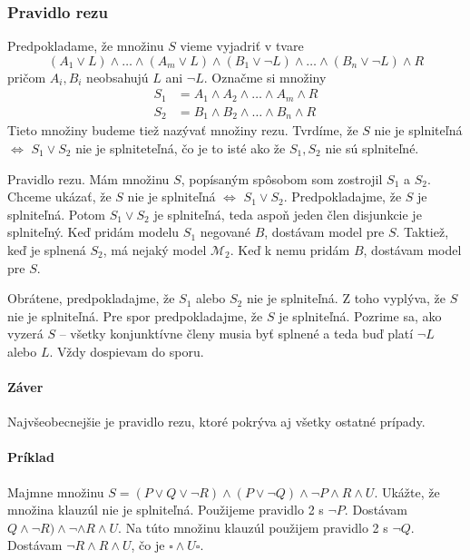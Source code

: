 \subsubsection{Pravidlo rezu}
Predpokladame, že množinu $S$ vieme vyjadriť v tvare
\begin{equation*}
    (A_1 \lor L) \land \ldots \land (A_m \lor L) \land 
    (B_1 \lor \neg L) \land \ldots \land (B_n \lor \neg L) \land R
\end{equation*}
pričom $A_i, B_i$ neobsahujú $L$ ani $\neg L$.
Označme si množiny
\begin{align*}
    S_1 &= A_1 \land A_2 \land \ldots \land A_m \land R \\
    S_2 &= B_1 \land B_2 \land \ldots \land B_n \land R
\end{align*}
Tieto množiny budeme tiež nazývať množiny rezu.
Tvrdíme, že $S$ nie je splniteľná $\iff$ $S_1 \lor S_2$ nie je
splniteteľná, čo je to isté ako že $S_1,S_2$ nie sú splniteľné.

\startFIXME

\begin{dokaz}
    Pravidlo rezu. Mám množinu $S$, popísaným spôsobom som zostrojil
    $S_1$ a $S_2$. Chceme ukázať, že $S$ nie je splniteľná $\iff$ $S_1 \lor
    S_2$. Predpokladajme, že $S$ je splniteľná. Potom $S_1 \lor S_2$ je
    splniteľná, teda aspoň jeden člen disjunkcie je splniteľný. Keď pridám
    modelu $S_1$ negované $B$, dostávam model pre $S$. Taktiež, keď je
    splnená $S_2$, má nejaký model $\mathcal{M_2}$. Keď k nemu pridám $B$,
    dostávam model pre $S$.

    \par Obrátene, predpokladajme, že $S_1$ alebo $S_2$ nie je splniteľná. Z
    toho vyplýva, že $S$ nie je splniteľná. Pre spor predpokladajme, že $S$
    je splniteľná. Pozrime sa, ako vyzerá $S$ -- všetky konjunktívne členy
    musia byť splnené a teda buď platí $\neg L$ alebo $L$. Vždy dospievam do
    sporu.
\end{dokaz}

\paragraph{Záver} Najvšeobecnejšie je pravidlo rezu, ktoré pokrýva aj všetky
ostatné prípady.

\paragraph{Príklad} Majmne množinu $S=(P \lor Q \lor \neg R) \land (P \lor \neg
Q) \land \neg P \land R \land U$. Ukážte, že množina klauzúl nie je splniteľná.
Použijeme pravidlo 2 s $\neg P$. Dostávam $Q\land\neg R) \land \neg  \land R
\land U$. Na túto množinu klauzúl použijem pravidlo 2 s $\neg Q$. Dostávam $\neg
R \land R \land U$, čo je $\square \land U \square$.




